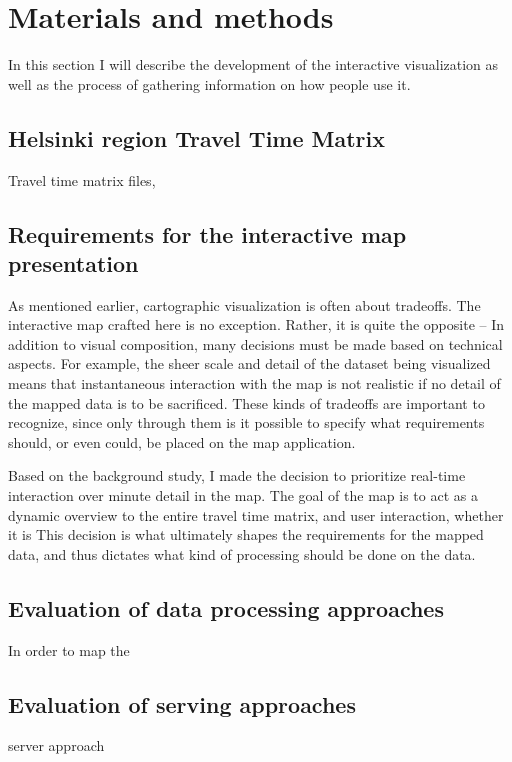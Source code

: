 \section{Materials and methods}
In this section I will describe the development of the interactive visualization
as well as the process of gathering information on how people use it.

\subsection{Helsinki region Travel Time Matrix}
Travel time matrix files,

\subsection{Requirements for the interactive map presentation}

As mentioned earlier, cartographic visualization is often about tradeoffs.
The interactive map crafted here is no exception.
Rather, it is quite the opposite -- In addition to visual composition,  %
many decisions must be made based on technical aspects. For example,
the sheer scale and detail of the dataset being visualized means that
instantaneous interaction with the map is not realistic
if no detail of the mapped data is to be sacrificed.
These kinds of tradeoffs are important to recognize,
since only through them is it possible to specify what
requirements should, or even could, be placed on the map application.

Based on the background study,
I made the decision to prioritize real-time interaction over minute detail in the map.
The goal of the map is to act as a dynamic overview to the entire travel time matrix,
and user interaction, whether it is 
This decision is what ultimately shapes the requirements for the mapped data,
and thus dictates what kind of processing should be done on the data.



\subsection{Evaluation of data processing approaches}
In order to map the 


\subsection{Evaluation of serving approaches}
server approach

